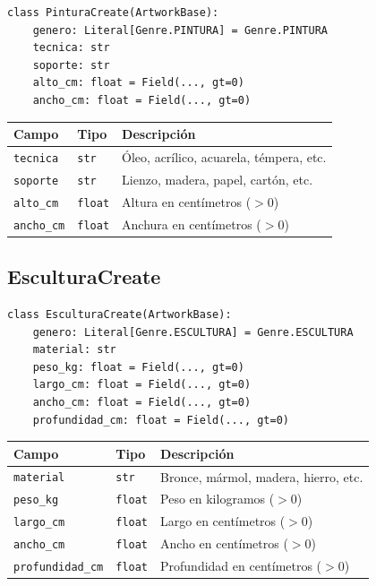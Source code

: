 \documentclass[12pt,a4paper]{article}
\begin{document}
\begin{lstlisting}
class PinturaCreate(ArtworkBase):
    genero: Literal[Genre.PINTURA] = Genre.PINTURA
    tecnica: str
    soporte: str
    alto_cm: float = Field(..., gt=0)
    ancho_cm: float = Field(..., gt=0)
\end{lstlisting}

\begin{center}
\begin{tabular}{lll}
\toprule
\textbf{Campo} & \textbf{Tipo} & \textbf{Descripción} \\
\midrule
\texttt{tecnica} & \texttt{str} & Óleo, acrílico, acuarela, témpera, etc. \\
\texttt{soporte} & \texttt{str} & Lienzo, madera, papel, cartón, etc. \\
\texttt{alto\_cm} & \texttt{float} & Altura en centímetros ($>0$) \\
\texttt{ancho\_cm} & \texttt{float} & Anchura en centímetros ($>0$) \\
\bottomrule
\end{tabular}
\end{center}

\subsection{EsculturaCreate}

\begin{lstlisting}
class EsculturaCreate(ArtworkBase):
    genero: Literal[Genre.ESCULTURA] = Genre.ESCULTURA
    material: str
    peso_kg: float = Field(..., gt=0)
    largo_cm: float = Field(..., gt=0)
    ancho_cm: float = Field(..., gt=0)
    profundidad_cm: float = Field(..., gt=0)
\end{lstlisting}

\begin{center}
\begin{tabular}{lll}
\toprule
\textbf{Campo} & \textbf{Tipo} & \textbf{Descripción} \\
\midrule
\texttt{material} & \texttt{str} & Bronce, mármol, madera, hierro, etc. \\
\texttt{peso\_kg} & \texttt{float} & Peso en kilogramos ($>0$) \\
\texttt{largo\_cm} & \texttt{float} & Largo en centímetros ($>0$) \\
\texttt{ancho\_cm} & \texttt{float} & Ancho en centímetros ($>0$) \\
\texttt{profundidad\_cm} & \texttt{float} & Profundidad en centímetros ($>0$) \\
\bottomrule
\end{tabular}
\end{center}
\end{document}
